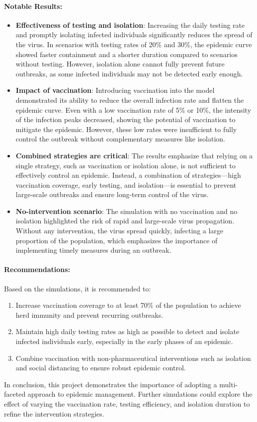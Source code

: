 \documentclass{article}
\begin{document}
\paragraph{Notable Results:}
\begin{itemize}
    \item \textbf{Effectiveness of testing and isolation}: Increasing the daily testing rate and promptly isolating infected individuals significantly reduces the spread of the virus. In scenarios with testing rates of 20\% and 30\%, the epidemic curve showed faster containment and a shorter duration compared to scenarios without testing. However, isolation alone cannot fully prevent future outbreaks, as some infected individuals may not be detected early enough.
    
    \item \textbf{Impact of vaccination}: Introducing vaccination into the model demonstrated its ability to reduce the overall infection rate and flatten the epidemic curve. Even with a low vaccination rate of 5\% or 10\%, the intensity of the infection peaks decreased, showing the potential of vaccination to mitigate the epidemic. However, these low rates were insufficient to fully control the outbreak without complementary measures like isolation.

    \item \textbf{Combined strategies are critical}: The results emphasize that relying on a single strategy, such as vaccination or isolation alone, is not sufficient to effectively control an epidemic. Instead, a combination of strategies—high vaccination coverage, early testing, and isolation—is essential to prevent large-scale outbreaks and ensure long-term control of the virus.

    \item \textbf{No-intervention scenario}: The simulation with no vaccination and no isolation highlighted the risk of rapid and large-scale virus propagation. Without any intervention, the virus spread quickly, infecting a large proportion of the population, which emphasizes the importance of implementing timely measures during an outbreak.
\end{itemize}

\paragraph{Recommendations:}
Based on the simulations, it is recommended to:
\begin{enumerate}
    \item Increase vaccination coverage to at least 70\% of the population to achieve herd immunity and prevent recurring outbreaks.
    \item Maintain high daily testing rates as high as possible to detect and isolate infected individuals early, especially in the early phases of an epidemic.
    \item Combine vaccination with non-pharmaceutical interventions such as isolation and social distancing to ensure robust epidemic control.
\end{enumerate}

In conclusion, this project demonstrates the importance of adopting a multi-faceted approach to epidemic management. Further simulations could explore the effect of varying the vaccination rate, testing efficiency, and isolation duration to refine the intervention strategies.
\end{document}
